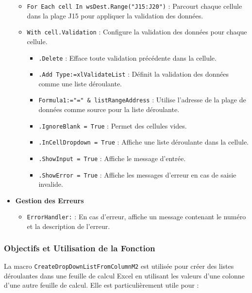 \documentclass[a4paper, oneside, 12pt, final]{extreport}
\begin{document}
\begin{itemize}
\begin{itemize}
    \item \texttt{For Each cell In wsDest.Range("J15:J20")} : Parcourt chaque cellule dans la plage J15 pour appliquer la validation des données.
    \item \texttt{With cell.Validation} : Configure la validation des données pour chaque cellule.
    \begin{itemize}
        \item \texttt{.Delete} : Efface toute validation précédente dans la cellule.
        \item \texttt{.Add Type:=xlValidateList} : Définit la validation des données comme une liste déroulante.
        \item \texttt{Formula1:="=" \& listRangeAddress} : Utilise l'adresse de la plage de données comme source pour la liste déroulante.
        \item \texttt{.IgnoreBlank = True} : Permet des cellules vides.
        \item \texttt{.InCellDropdown = True} : Affiche une liste déroulante dans la cellule.
        \item \texttt{.ShowInput = True} : Affiche le message d'entrée.
        \item \texttt{.ShowError = True} : Affiche les messages d'erreur en cas de saisie invalide.
    \end{itemize}
\end{itemize}

\item\textbf{Gestion des Erreurs}

\begin{itemize}
    \item \texttt{ErrorHandler:} : En cas d'erreur, affiche un message contenant le numéro et la description de l'erreur.
\end{itemize}
\end{itemize}

\subsubsection{Objectifs et Utilisation de la Fonction}

La macro \texttt{CreateDropDownListFromColumnM2} est utilisée pour créer des listes déroulantes dans une feuille de calcul Excel en utilisant les valeurs d'une colonne d'une autre feuille de calcul. Elle est particulièrement utile pour :
\end{document}
